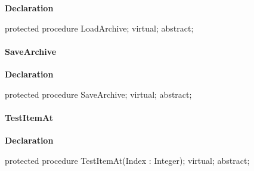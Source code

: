 \documentclass{report}
\newif\ifpdf
\begin{document}
\label{AbArcTyp.TAbArchive-LoadArchive}
\begin{list}{}{
\setlength{\itemindent}{0cm}
\setlength{\listparindent}{0cm}
\setlength{\leftmargin}{\evensidemargin}
\addtolength{\leftmargin}{\tmplength}
\settowidth{\labelsep}{X}
\addtolength{\leftmargin}{\labelsep}
\setlength{\labelwidth}{\tmplength}
}
\item[\textbf{Declaration}\hfill]
\ifpdf
\begin{flushleft}
\fi
\begin{ttfamily}
protected procedure LoadArchive; virtual; abstract;\end{ttfamily}

\ifpdf
\end{flushleft}
\fi

\end{list}
\paragraph*{SaveArchive}\hspace*{\fill}

\label{AbArcTyp.TAbArchive-SaveArchive}
\begin{list}{}{
\setlength{\itemindent}{0cm}
\setlength{\listparindent}{0cm}
\setlength{\leftmargin}{\evensidemargin}
\addtolength{\leftmargin}{\tmplength}
\settowidth{\labelsep}{X}
\addtolength{\leftmargin}{\labelsep}
\setlength{\labelwidth}{\tmplength}
}
\item[\textbf{Declaration}\hfill]
\ifpdf
\begin{flushleft}
\fi
\begin{ttfamily}
protected procedure SaveArchive; virtual; abstract;\end{ttfamily}

\ifpdf
\end{flushleft}
\fi

\end{list}
\paragraph*{TestItemAt}\hspace*{\fill}

\label{AbArcTyp.TAbArchive-TestItemAt}
\begin{list}{}{
\setlength{\itemindent}{0cm}
\setlength{\listparindent}{0cm}
\setlength{\leftmargin}{\evensidemargin}
\addtolength{\leftmargin}{\tmplength}
\settowidth{\labelsep}{X}
\addtolength{\leftmargin}{\labelsep}
\setlength{\labelwidth}{\tmplength}
}
\item[\textbf{Declaration}\hfill]
\ifpdf
\begin{flushleft}
\fi
\begin{ttfamily}
protected procedure TestItemAt(Index : Integer); virtual; abstract;\end{ttfamily}

\ifpdf
\end{flushleft}
\fi

\end{list}
\end{document}
